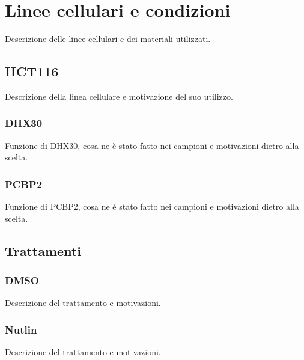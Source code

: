 \chapter{Linee cellulari e condizioni}
\label{cha:cell_lines}
Descrizione delle linee cellulari e dei materiali utilizzati.

\section{HCT116}
\label{sec:hct116}
Descrizione della linea cellulare e motivazione del suo utilizzo.

  \subsection{DHX30}
  \label{subsec:dhx30}
  Funzione di DHX30, cosa ne \`e stato fatto nei campioni e motivazioni dietro alla scelta.

  \subsection{PCBP2}
  \label{subsec:pcbp2}
  Funzione di PCBP2, cosa ne \`e stato fatto nei campioni e motivazioni dietro alla scelta.

\section{Trattamenti}
\label{sec:trattamenti}

  \subsection{DMSO}
  \label{subsec:dmso}
  Descrizione del trattamento e motivazioni.

  \subsection{Nutlin}
  \label{subsec:nutlin}
  Descrizione del trattamento e motivazioni.
